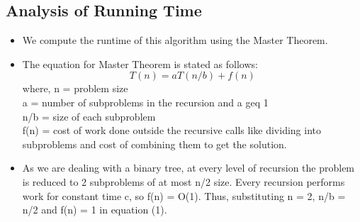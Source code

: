 \documentclass[12pt]{article}
\begin{document}
\subsection{Analysis of Running Time}
\begin{itemize}
    \item We compute the runtime of this algorithm using the Master Theorem.
    
    \item The equation for Master Theorem is stated as follows:
    \begin{equation}
        T(n) = aT(n/b) + f(n) 
    \end{equation}
    where, 
        n = problem size \\
        a = number of subproblems in the recursion and a geq 1 \\
        n/b = size of each subproblem \\
        f(n) = cost of work done outside the recursive calls like dividing into subproblems and cost of combining them to get the solution. 
    \item As we are dealing with a binary tree, at every level of recursion the problem is reduced to 2 subproblems of at most n/2 size. Every recursion performs work for constant time c, so f(n) = O(1). Thus, substituting n = 2, n/b = n/2 and f(n) = 1 in equation (1).
    

\end{itemize}
\end{document}

